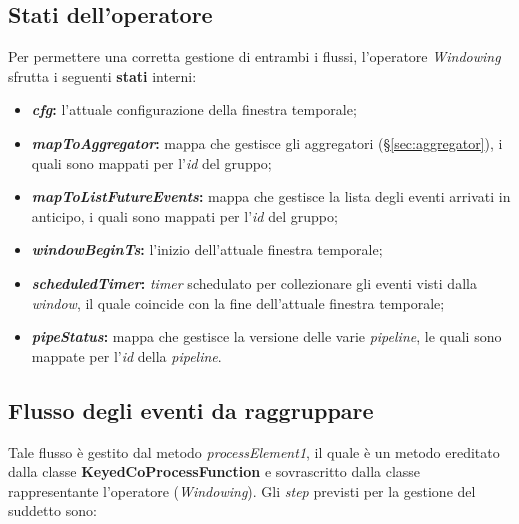 \subsection{Stati dell'operatore}\label{sec:stati-windowing}
Per permettere una corretta gestione di entrambi i flussi, l'operatore \textit{Windowing} sfrutta i seguenti \textbf{stati} interni:
\begin{itemize}
		\item{\textbf{\textit{cfg}:} l'attuale configurazione della finestra temporale;}
		\item{\textbf{\textit{mapToAggregator}:} mappa che gestisce gli aggregatori (\S\ref{sec:aggregator}), i quali sono mappati per l'\textit{id} del gruppo;}
		\item{\textbf{\textit{mapToListFutureEvents}:} mappa che gestisce la lista degli eventi arrivati in anticipo, i quali sono mappati per l'\textit{id} del gruppo;}
		\item{\textbf{\textit{windowBeginTs}:} l'inizio dell'attuale finestra temporale;}
		\item{\textbf{\textit{scheduledTimer}:} \textit{timer} schedulato per collezionare gli eventi visti dalla \textit{window}, il quale coincide con la fine dell'attuale finestra temporale;}
		\item{\textbf{\textit{pipeStatus}:} mappa che gestisce la versione delle varie \textit{\gls{pipeline}}, le quali sono mappate per l'\textit{id} della \textit{\gls{pipeline}}.}
\end{itemize}


\subsection{Flusso degli eventi da raggruppare}\label{sec:pr1-windowing}
Tale flusso è gestito dal metodo \textit{processElement1}, il quale è un metodo ereditato dalla classe \textbf{KeyedCoProcessFunction} e sovrascritto dalla classe rappresentante l'operatore (\textit{Windowing}). Gli \textit{step} previsti per la gestione del suddetto sono:

